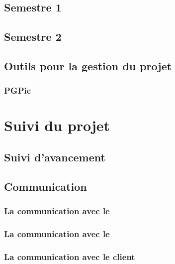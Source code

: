 \subsection*{Semestre 1}

\subsection*{Semestre 2}


\subsection{Outils pour la gestion du projet}


\subsubsection*{PGPic}

\subsubsection*{}

\subsubsection*{}

\section{Suivi du projet} 


\subsection{Suivi d'avancement}

\subsection{Communication}
\subsubsection*{La communication avec le \tuteurPedagogique{}}
\subsubsection*{La communication avec le \tuteurQualite{}}
\subsubsection*{La communication avec le client}
